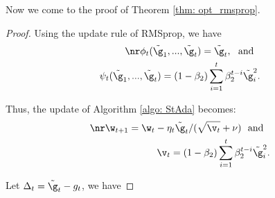 Now we come to the proof of Theorem \ref{thm: opt_rmsprop}.
\begin{proof}
Using the update rule of RMSprop, we have
\begin{equation}
\begin{split} \nr
    \phi_t(\tilde \g_1,...,\tilde \g_t) = \tilde \g_t, \ \  \text{and} \ \  \\ \psi_t(\tilde \g_1,...,\tilde \g_t) = \left(1-\beta_{2}\right) \sum_{i=1}^{t} \beta_{2}^{t-i} \tilde \g_{i}^{2}.
\end{split}
\end{equation}

Thus, the update of Algorithm \ref{algo: StAda} becomes:
\begin{equation}
\begin{split} \nr
    \w_{t+1} = \w_t - \eta_t \tilde  \g_t /(\sqrt{\v_t} + \nu) \ \ \text{and} \ \   \\
    \v_t = \left(1-\beta_{2}\right) \sum_{i=1}^{t} \beta_{2}^{t-i} \tilde \g_{i}^{2}.
\end{split}
\end{equation}

Let $\Delta_t = \tilde \g_t - g_t$, we have


\end{proof}
